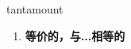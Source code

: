 
\begin{frame}
{\huge tantamount}
\begin{center}
\begin{enumerate}\Large
  \item \textbf{等价的，与...相等的}
\end{enumerate}
\end{center}
\end{frame}
